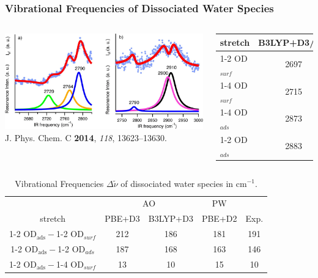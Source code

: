 \documentclass[hyperref={pdfpagelabels=false}]{beamer}
\begin{document}
\begin{frame}
 \frametitle{Vibrational Frequencies of Dissociated Water Species}
 \begin{columns}
  \centering
  \includegraphics[width=1.1\textwidth]{figures/0001_OD_vib_exp.jpeg}\\
  \footnotesize{J. Phys. Chem. C \textbf{2014}, \textit{118}, 13623--13630.}
  \begin{table}[!h]
  \centering
  \begin{tabular}{l|cc}
  \toprule
 stretch &B3LYP+D3/AO & Exp.\\\midrule
 1-2 OD$_{surf}$&2697&2729\\
 1-4 OD$_{surf}$&2715&2764\\
 1-4 OD$_{ads}$&2873&2900\\
 1-2 OD$_{ads}$&2883&2910\\\bottomrule
  \end{tabular}
 \end{table}
 \end{columns}
 \vspace{-.5cm}
 \pause
  \begin{table}[!h]
  \centering
    \caption{Vibrational Frequencies $\Delta \tilde{\nu}$ of dissociated water species in cm$^{-1}$.}
    \vspace{-0.5cm}
  \begin{tabular}{c|cc|c|c}
  \toprule
& \multicolumn{2}{c}{AO} & PW & \\
 stretch &PBE+D3 & B3LYP+D3 & PBE+D2 & Exp.\\\midrule
 1-2 OD$_{\textrm{ads}}-$1-2 OD$_{surf}$& 212& 186& 181& 191 \\
 1-2 OD$_{\textrm{ads}}-$1-2 OD$_{ads}$ & 187& 168& 163& 146\\
 1-2 OD$_{\textrm{ads}}-$1-4 OD$_{surf}$& 13& 10& 15& 10\\\bottomrule
  \end{tabular}
 \end{table}
\end{frame} 
\end{document}
